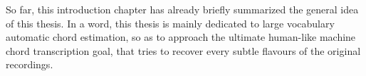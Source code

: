 So far, this introduction chapter has already briefly summarized the general idea of this thesis. In a word, this thesis is mainly dedicated to large vocabulary automatic chord estimation, so as to approach the ultimate human-like machine chord transcription goal, that tries to recover every subtle flavours of the original recordings.

















